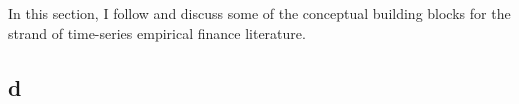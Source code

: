 In this section, I follow \citet[Chapter~5]{campbell2017financial} and discuss some 
of the conceptual building blocks for the strand of time-series empirical finance literature.

\subsection{d}
